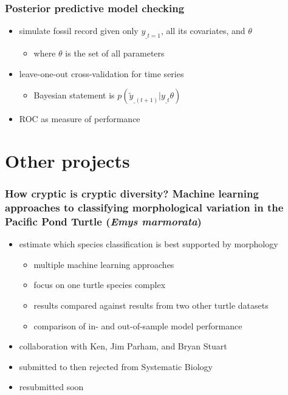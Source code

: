 \documentclass{beamer}
\begin{document}
\begin{frame}
  \frametitle{Posterior predictive model checking}
  \begin{itemize}
    \item simulate fossil record given only \(y_{\_t = 1}\), all its covariates, and \(\theta\)
      \begin{itemize}
        \item where \(\theta\) is the set of all parameters
      \end{itemize}
    \item leave-one-out cross-validation for time series
      \begin{itemize}
        \item Bayesian statement is \(p(\tilde{y}_{\_(t + 1)} | y_{\_t} \theta)\)
      \end{itemize}
    \item ROC as measure of performance
  \end{itemize}
\end{frame}


\section{Other projects}

\begin{frame}
  \frametitle{How cryptic is cryptic diversity? Machine learning approaches to classifying morphological variation in the Pacific Pond Turtle (\textit{Emys marmorata})}
  \begin{itemize}
    \item estimate which species classification is best supported by morphology
      \begin{itemize}
        \item multiple machine learning approaches
        \item focus on one turtle species complex
        \item results compared against results from two other turtle datasets
        \item comparison of in- and out-of-sample model performance
      \end{itemize}
    \item collaboration with Ken, Jim Parham, and Bryan Stuart
    \item submitted to then rejected from Systematic Biology
    \item resubmitted soon
  \end{itemize}
\end{frame}
\end{document}
